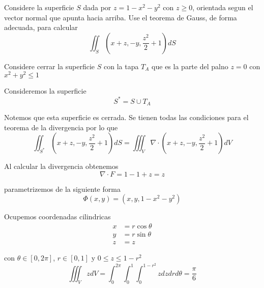 \documentclass[../main.tex]{subfiles}
\begin{document}
\begin{problem}
  Considere la superficie $S$ dada por $z = 1 - x^{2} - y^{2}$ con $z \geq 0$, orientada segun el vector normal que apunta hacia arriba. Use el teorema de Gauss, de forma adecuada, para calcular
  \begin{equation*}
    \iint_{S} (x + z, -y, \frac{z^{2}}{2} + 1) dS
  \end{equation*}

  Considere cerrar la superficie $S$ con la tapa $T_{A}$ que es la parte del palno $z = 0$ con $x^{2} + y^{2} \leq 1$
\end{problem}
\begin{solution}
  Consideremos la superficie
  \begin{equation*}
    S^{*} = S \cup T_{A}
  \end{equation*}

  Notemos que esta superficie es cerrada. Se tienen todas las condiciones para el teorema de la divergencia por lo que
  \begin{equation*}
    \iint_{S^{*}} (x + z, -y, \frac{z^{2}}{2} + 1) dS = \iiint_{V} \nabla \cdot (x + z, -y, \frac{z^{2}}{2} + 1) dV
  \end{equation*}

  Al calcular la divergencia obtenemos
  \begin{equation*}
    \nabla \cdot F = 1 - 1 + z = z
  \end{equation*}

  parametrizemos de la siguiente forma
  \begin{equation*}
    \Phi(x, y) = (x, y, 1 - x^{2} - y^{2})
  \end{equation*}

  Ocupemos coordenadas cilindricas
  \begin{align*}
    x &= r \cos \theta\\
    y &= r \sin \theta\\
    z &= z
  \end{align*}

  con $\theta \in [0, 2\pi]$, $r \in [0, 1]$ y $0 \leq z \leq 1 - r^{2}$
  \begin{equation*}
    \iiint_{V} z dV = \int_{0}^{2\pi}\int_{0}^{1}\int_{0}^{1 - r^{2}} z dz dr d \theta = \frac{\pi}{6}
  \end{equation*}
\end{solution}
\end{document}
